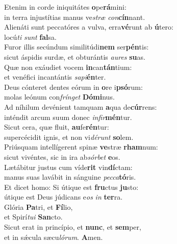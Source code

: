 \evenverse Etenim in corde iniquitátes \textbf{o}pe\textbf{rá}mini:~\*\\
\evenverse in terra injustítias manus ve\textit{stræ} \textit{con}\textbf{cín}nant.\\
\oddverse Alienáti sunt peccatóres a vulva, erra\textbf{vé}runt ab \textbf{ú}tero:~\*\\
\oddverse locú\textit{ti} \textit{sunt} \textbf{fal}sa.\\
\evenverse Furor illis secúndum similitúdi\textbf{nem} ser\textbf{pén}tis:~\*\\
\evenverse sicut áspidis surdæ, et obturántis \textit{au}\textit{res} \textbf{su}as.\\
\oddverse Quæ non exáudiet vocem \textbf{in}can\textbf{tán}tium:~\*\\
\oddverse et venéfici incantántis \textit{sa}\textit{pi}\textbf{én}ter.\\
\evenverse Deus cónteret dentes eórum in \textbf{o}re i\textbf{psó}rum:~\*\\
\evenverse molas leónum con\textit{frín}\textit{get} \textbf{Dó}\textbf{mi}nus.\\
\oddverse Ad níhilum devénient tamquam \textbf{a}qua de\textbf{cúr}rens:~\*\\
\oddverse inténdit arcum suum donec \textit{in}\textit{fir}\textbf{mén}tur.\\
\evenverse Sicut cera, quæ fluit, \textbf{au}fe\textbf{rén}tur:~\*\\
\evenverse supercécidit ignis, et non vi\textit{dé}\textit{runt} \textbf{so}lem.\\
\oddverse Priúsquam intellígerent spinæ \textbf{ve}stræ \textbf{rham}num:~\*\\
\oddverse sicut vivéntes, sic in ira ab\textit{sór}\textit{bet} \textbf{e}os.\\
\evenverse Lætábitur justus cum víde\textbf{rit} vin\textbf{dí}ctam:~\*\\
\evenverse manus suas lavábit in sánguine \textit{pec}\textit{ca}\textbf{tó}ris.\\
\oddverse Et dicet homo: Si útique est \textbf{fru}ctus \textbf{ju}sto:~\*\\
\oddverse útique est Deus júdicans e\textit{os} \textit{in} \textbf{ter}ra.\\
\evenverse Glória \textbf{Pa}tri, et \textbf{Fí}lio,~\*\\
\evenverse et Spirí\textit{tu}\textit{i} \textbf{San}cto.\\
\oddverse Sicut erat in princípio, et \textbf{nunc}, et \textbf{sem}per,~\*\\
\oddverse et in sǽcula sæcu\textit{ló}\textit{rum}. \textbf{A}men.\\
